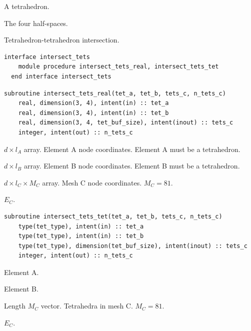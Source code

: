 \documentclass{article}
\begin{document}
\begin{description}[font=\ttfamily\bfseries,leftmargin=2.2\parindent,labelindent=1.7\parindent,noitemsep]
  \item[tet] A tetrahedron.
  \item[plane] The four half-spaces.
\end{description}

\noindent Tetrahedron-tetrahedron intersection.

\begin{lstlisting}[language=FORTRAN]
  interface intersect_tets
    module procedure intersect_tets_real, intersect_tets_tet
  end interface intersect_tets
\end{lstlisting}

\begin{lstlisting}[language=FORTRAN]
  subroutine intersect_tets_real(tet_a, tet_b, tets_c, n_tets_c)
    real, dimension(3, 4), intent(in) :: tet_a
    real, dimension(3, 4), intent(in) :: tet_b
    real, dimension(3, 4, tet_buf_size), intent(inout) :: tets_c
    integer, intent(out) :: n_tets_c
\end{lstlisting}

\begin{description}[font=\ttfamily\bfseries,leftmargin=2.2\parindent,labelindent=1.7\parindent,noitemsep]
  \item[tet\_a] $d \times l_A$ array. Element A node coordinates. Element A must
    be a tetrahedron.
  \item[tet\_b] $d \times l_B$ array. Element B node coordinates. Element B must
    be a tetrahedron.
  \item[tets\_c] $d \times l_C \times M_C$ array. Mesh C node coordinates.
    $M_C = 81$.
  \item[n\_tets\_c] $E_C$.
\end{description}

\begin{lstlisting}[language=FORTRAN]
  subroutine intersect_tets_tet(tet_a, tet_b, tets_c, n_tets_c)
    type(tet_type), intent(in) :: tet_a
    type(tet_type), intent(in) :: tet_b
    type(tet_type), dimension(tet_buf_size), intent(inout) :: tets_c
    integer, intent(out) :: n_tets_c
\end{lstlisting}

\begin{description}[font=\ttfamily\bfseries,leftmargin=2.2\parindent,labelindent=1.7\parindent,noitemsep]
  \item[tet\_a] Element A.
  \item[tet\_b] Element B.
  \item[tets\_c] Length $M_C$ vector. Tetrahedra in mesh C. $M_C = 81$.
  \item[n\_tets\_c] $E_C$.
\end{description}
\end{document}

